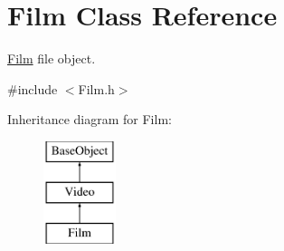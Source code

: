 \hypertarget{classFilm}{\section{Film Class Reference}
\label{classFilm}
}


\hyperlink{classFilm}{Film} file object.  




{\ttfamily \#include $<$Film.\-h$>$}

Inheritance diagram for Film\-:\begin{figure}[H]
\begin{center}
\leavevmode
\includegraphics[height=3.000000cm]{classFilm}
\end{center}
\end{figure}
